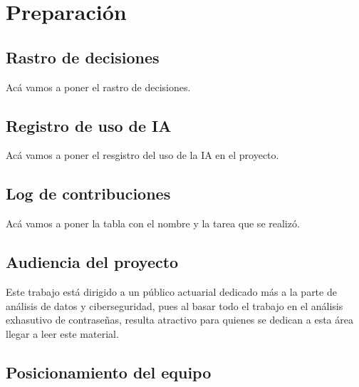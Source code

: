 \documentclass[
  10pt,
  letterpaper,
  12pt,
  oneside]{book}
\author{}
\date{}
\begin{document}
\frontmatter


\mainmatter
\clearpage
\thispagestyle{empty}
\tableofcontents*
\thispagestyle{empty}

\newpage
\setcounter{page}{1}

\chapter*{Preparación}

\section*{Rastro de decisiones}

Acá vamos a poner el rastro de decisiones.

\section*{Registro de uso de IA}

Acá vamos a poner el resgistro del uso de la IA en el proyecto.

\section*{Log de contribuciones}

Acá vamos a poner la tabla con el nombre y la tarea que se realizó.

\section*{Audiencia del proyecto}

Este trabajo está dirigido a un público actuarial dedicado más a la
parte de análisis de datos y ciberseguridad, pues al basar todo el
trabajo en el análisis exhasutivo de contraseñas, resulta atractivo para
quienes se dedican a esta área llegar a leer este material.

\section*{Posicionamiento del equipo}
\end{document}
